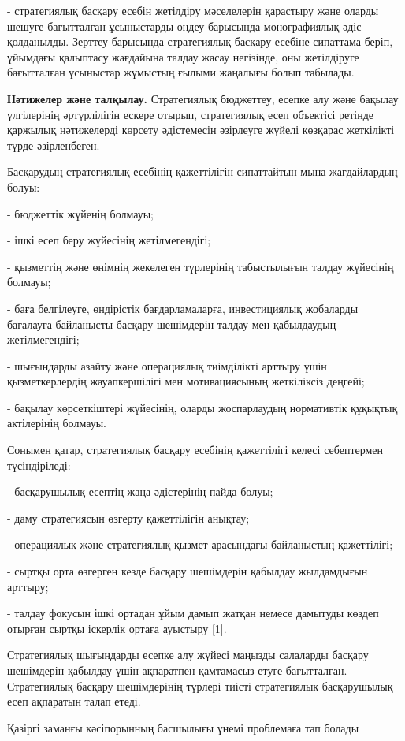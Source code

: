 - стратегиялық басқару есебін жетілдіру мәселелерін қарастыру және
оларды шешуге бағытталған ұсыныстарды өңдеу барысында монографиялық
әдіс қолданылды.
Зерттеу барысында стратегиялық басқару есебіне сипаттама беріп, ұйымдағы
қалыптасу жағдайына талдау жасау негізінде, оны жетілдіруге бағытталған
ұсыныстар жұмыстың ғылыми жаңалығы болып табылады.

{\bfseries Нәтижелер және талқылау.} Стратегиялық бюджеттеу, есепке алу
және бақылау үлгілерінің әртүрлілігін ескере отырып, стратегиялық есеп
объектісі ретінде қаржылық нәтижелерді көрсету әдістемесін әзірлеуге
жүйелі көзқарас жеткілікті түрде әзірленбеген.

Басқарудың стратегиялық есебінің қажеттілігін сипаттайтын мына
жағдайлардың болуы:

- бюджеттік жүйенің болмауы;

- ішкі есеп беру жүйесінің жетілмегендігі;

- қызметтің және өнімнің жекелеген түрлерінің табыстылығын талдау
жүйесінің болмауы;

- баға белгілеуге, өндірістік бағдарламаларға, инвестициялық жобаларды
бағалауға байланысты басқару шешімдерін талдау мен қабылдаудың
жетілмегендігі;

- шығындарды азайту және операциялық тиімділікті арттыру үшін
қызметкерлердің жауапкершілігі мен мотивациясының жеткіліксіз деңгейі;

- бақылау көрсеткіштері жүйесінің, оларды жоспарлаудың нормативтік
құқықтық актілерінің болмауы.

Сонымен қатар, стратегиялық басқару есебінің қажеттілігі келесі
себептермен түсіндіріледі:

- басқарушылық есептің жаңа әдістерінің пайда болуы;

- даму стратегиясын өзгерту қажеттілігін анықтау;

- операциялық және стратегиялық қызмет арасындағы байланыстың
қажеттілігі;

- сыртқы орта өзгерген кезде басқару шешімдерін қабылдау жылдамдығын
арттыру;

- талдау фокусын ішкі ортадан ұйым дамып жатқан немесе дамытуды көздеп
отырған сыртқы іскерлік ортаға ауыстыру {[}1{]}.

Стратегиялық шығындарды есепке алу жүйесі маңызды салаларды басқару
шешімдерін қабылдау үшін ақпаратпен қамтамасыз етуге бағытталған.
Стратегиялық басқару шешімдерінің түрлері тиісті стратегиялық
басқарушылық есеп ақпаратын талап етеді.

Қазіргі заманғы кәсіпорынның басшылығы үнемі проблемаға тап болады

